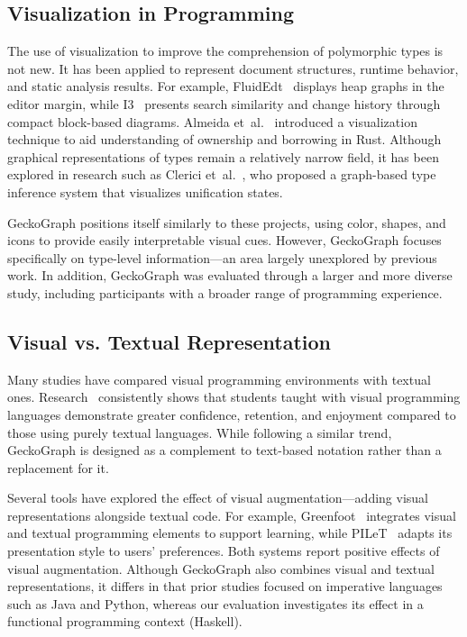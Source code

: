 \documentclass[preprint,12pt]{elsarticle}
\begin{document}
\subsection{Visualization in Programming}
\label{sec:viz-programming}

The use of visualization to improve the comprehension of polymorphic types is not new. 
It has been applied to represent document structures, runtime behavior, and static analysis results. 
For example, FluidEdt~\cite{Ou2015-vr} displays heap graphs in the editor margin, while I3~\cite{Beck2015-my} presents search similarity and change history through compact block-based diagrams. 
Almeida et~al.~\cite{Almeida2022-bv} introduced a visualization technique to aid understanding of ownership and borrowing in Rust. 
Although graphical representations of types remain a relatively narrow field, it has been explored in research such as Clerici et~al.~\cite{Clerici2013-ru}, who proposed a graph-based type inference system that visualizes unification states.

GeckoGraph positions itself similarly to these projects, using color, shapes, and icons to provide easily interpretable visual cues. 
However, GeckoGraph focuses specifically on type-level information—an area largely unexplored by previous work. 
In addition, GeckoGraph was evaluated through a larger and more diverse study, including participants with a broader range of programming experience.

\subsection{Visual vs. Textual Representation}
\label{sec:visual-vs-textual}

Many studies have compared visual programming environments with textual ones. 
Research~\cite{Noone2018-wl, Da_Silva_Ribeiro2014-tm, Cliburn2008-jo, Daly2011-is} consistently shows that students taught with visual programming languages demonstrate greater confidence, retention, and enjoyment compared to those using purely textual languages. 
While following a similar trend, GeckoGraph is designed as a complement to text-based notation rather than a replacement for it.

Several tools have explored the effect of visual augmentation—adding visual representations alongside textual code. 
For example, Greenfoot~\cite{Montero2010-uh} integrates visual and textual programming elements to support learning, while PILeT~\cite{Alshaigy2015-wy} adapts its presentation style to users’ preferences. 
Both systems report positive effects of visual augmentation. 
Although GeckoGraph also combines visual and textual representations, it differs in that prior studies focused on imperative languages such as Java and Python, whereas our evaluation investigates its effect in a functional programming context (Haskell).
\end{document}
